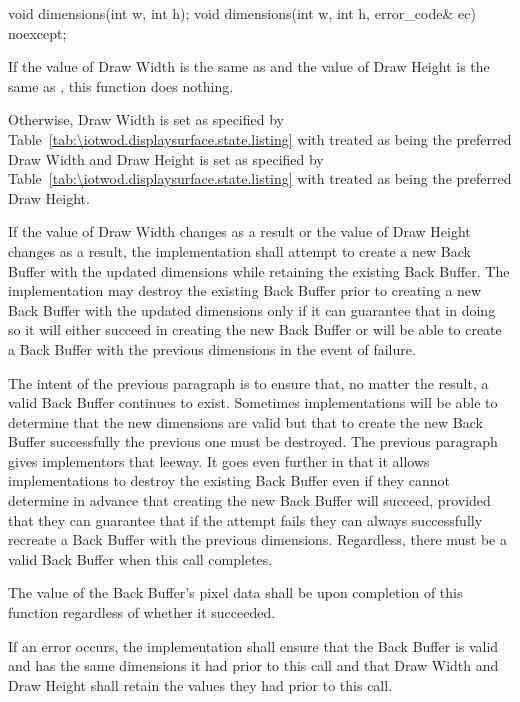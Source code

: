 \begin{itemdecl}
void dimensions(int w, int h);
void dimensions(int w, int h, error_code& ec) noexcept;
\end{itemdecl}
\begin{itemdescr}
\pnum
\effects
If the value of Draw Width is the same as  and the value of Draw Height is the same as , this function does nothing.

\pnum
Otherwise, Draw Width is set as specified by Table~\ref{tab:\iotwod.displaysurface.state.listing} with  treated as being the preferred Draw Width and Draw Height is set as specified by Table~\ref{tab:\iotwod.displaysurface.state.listing} with  treated as being the preferred Draw Height.

\pnum
If the value of Draw Width changes as a result or the value of Draw Height changes as a result, the implementation shall attempt to create a new Back Buffer with the updated dimensions while retaining the existing Back Buffer. The implementation may destroy the existing Back Buffer prior to creating a new Back Buffer with the updated dimensions only if it can guarantee that in doing so it will either succeed in creating the new Back Buffer or will be able to create a Back Buffer with the previous dimensions in the event of failure.

\pnum
\begin{note}
The intent of the previous paragraph is to ensure that, no matter the result, a valid Back Buffer continues to exist. Sometimes implementations will be able to determine that the new dimensions are valid but that to create the new Back Buffer successfully the previous one must be destroyed. The previous paragraph gives implementors that leeway. It goes even further in that it allows implementations to destroy the existing Back Buffer even if they cannot determine in advance that creating the new Back Buffer will succeed, provided that they can guarantee that if the attempt fails they can always successfully recreate a Back Buffer with the previous dimensions. Regardless, there must be a valid Back Buffer when this call completes.
\end{note}

\pnum
The value of the Back Buffer's pixel data shall be \unspecnorm upon completion of this function regardless of whether it succeeded.

\pnum
If an error occurs, the implementation shall ensure that the Back Buffer is valid and has the same dimensions it had prior to this call and that Draw Width and Draw Height shall retain the values they had prior to this call.


\end{itemdescr}
